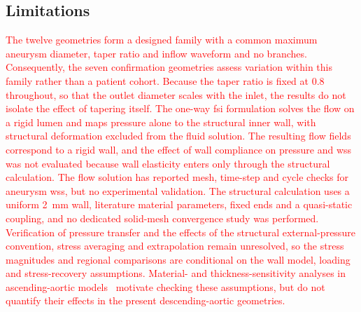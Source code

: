 \documentclass[12pt,a4paper]{article}
\newcommand{\FSI}{\ac{fsi}\xspace}
\newcommand{\WSS}{\ac{wss}\xspace}
\theoremstyle{definition}
\numberwithin{equation}{section}
\newcommand{\revision}[1]{\textcolor{red}{#1}}
\begin{document}
\subsection{Limitations}
\label{Limitations}
\revision{The twelve geometries form a designed family with a common maximum aneurysm diameter, taper ratio and inflow waveform and no branches. Consequently, the seven confirmation geometries assess variation within this family rather than a patient cohort. Because the taper ratio is fixed at 0.8 throughout, so that the outlet diameter scales with the inlet, the results do not isolate the effect of tapering itself. The one-way \FSI formulation solves the flow on a rigid lumen and maps pressure alone to the structural inner wall, with structural deformation excluded from the fluid solution. The resulting flow fields correspond to a rigid wall, and the effect of wall compliance on pressure and \WSS was not evaluated because wall elasticity enters only through the structural calculation. The flow solution has reported mesh, time-step and cycle checks for aneurysm \WSS, but no experimental validation. The structural calculation uses a uniform 2~mm wall, literature material parameters, fixed ends and a quasi-static coupling, and no dedicated solid-mesh convergence study was performed. Verification of pressure transfer and the effects of the structural external-pressure convention, stress averaging and extrapolation remain unresolved, so the stress magnitudes and regional comparisons are conditional on the wall model, loading and stress-recovery assumptions. Material- and thickness-sensitivity analyses in ascending-aortic models~\cite{zhu2025material} motivate checking these assumptions, but do not quantify their effects in the present descending-aortic geometries.}
\end{document}
